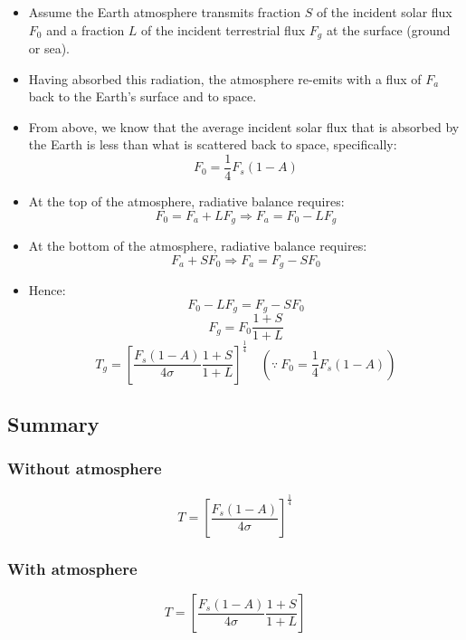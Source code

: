 \documentclass[11pt]{article}
\begin{document}
\begin{itemize}
\item Assume the Earth atmosphere transmits fraction \(S\) of the incident solar flux \(F_0\) and a fraction \(L\) of the incident terrestrial flux \(F_g\) at the surface (ground or sea).
\item Having absorbed this radiation, the atmosphere re-emits with a flux of \(F_a\) back to the Earth's surface and to space.
\item From above, we know that the average incident solar flux that is absorbed by the Earth is less than what is scattered back to space, specifically:
\[F_0 = \frac{1}{4} F_s (1-A)\]

\item At the top of the atmosphere, radiative balance requires:
\[F_0 = F_a + LF_g \Rightarrow F_a = F_0 - LF_g\]

\item At the bottom of the atmosphere, radiative balance requires:
\[F_a + SF_0 \Rightarrow F_a = F_g - SF_0\]

\item Hence:
\[F_0 - LF_g = F_g - SF_0\]
\[F_g = F_0 \frac{1+ S}{1 + L}\]
\[T_g = \left[\frac{F_s(1 - A)}{4 \sigma} \frac{1+S}{1+L} \right]^{\frac{1}{4}} \quad \left(\because \ F_0 = \frac{1}{4} F_s (1 - A) \right)\]
\end{itemize}

\subsection{Summary}
\label{sec:orgaa2c8c8}

\subsubsection{Without atmosphere}
\label{sec:org5d7e1d3}
\[T = \left[\frac{F_s(1-A)}{4 \sigma} \right]^{\frac{1}{4}}\]

\subsubsection{With atmosphere}
\label{sec:org40cc3a6}
\[T = \left[\frac{F_s(1-A)}{4 \sigma} \frac{1+S}{1+L} \right]\]
\end{document}

